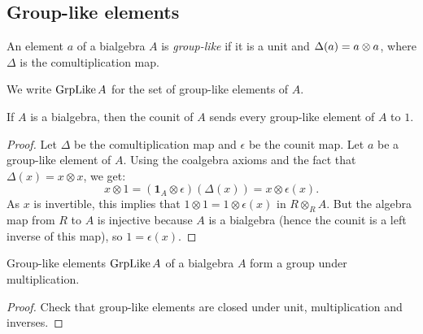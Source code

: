 \subsection{Group-like elements}


\begin{definition}
  \label{0-grp-like}
  \uses{}
  \leanok

  An element $a$ of a bialgebra $A$ is \emph{group-like} if it is a unit and $\Delta(a) = a \otimes a$,
  where $\Delta$ is the comultiplication map.

  We write $\operatorname{GrpLike} A$ for the set of group-like elements of $A$.
\end{definition}


\begin{lemma}
  \label{0-grp-like-counit}
  \leanok

  If $A$ is a bialgebra, then the counit of $A$ sends every group-like element of
  $A$ to $1$.
\end{lemma}
\begin{proof}
  \uses{}
  \leanok

  Let $\Delta$ be the comultiplication map and $\epsilon$ be the counit map.
  Let $a$ be a group-like element of $A$.
  Using the coalgebra axioms and the fact that $\Delta(x) = x\otimes x$, we get:
  \[x \otimes 1 = (\mathbf{1}_A\otimes\epsilon)(\Delta(x))= x \otimes\epsilon(x).\]
  As $x$ is invertible, this implies that $1\otimes 1 = 1\otimes\epsilon(x)$ in
  $R\otimes_R A$. But the algebra map from $R$ to $A$ is injective because $A$
  is a bialgebra (hence the counit is a left inverse of this map), so $1=\epsilon(x)$.
\end{proof}


\begin{proposition}
  \label{0-grp-like-grp}
  \leanok

  Group-like elements $\operatorname{GrpLike} A$ of a bialgebra $A$ form a group under multiplication.
\end{proposition}
\begin{proof}
  \uses{}
  \leanok

  Check that group-like elements are closed under unit, multiplication and inverses.
\end{proof}


